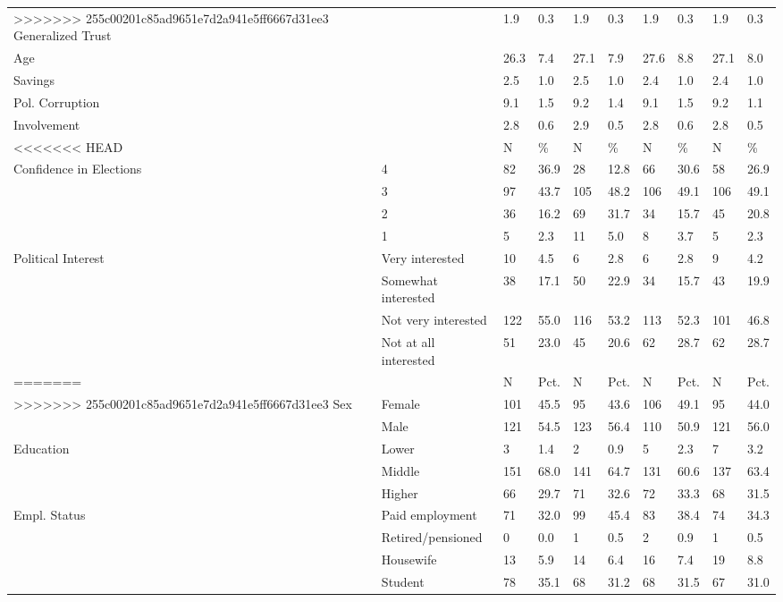 \begin{table}
\begin{tabular}[t]{llllllllll}
>>>>>>> 255c00201c85ad9651e7d2a941e5ff6667d31ee3
Generalized Trust &  & 1.9 & 0.3 & 1.9 & 0.3 & 1.9 & 0.3 & 1.9 & 0.3\\
Age &  & 26.3 & 7.4 & 27.1 & 7.9 & 27.6 & 8.8 & 27.1 & 8.0\\
Savings &  & 2.5 & 1.0 & 2.5 & 1.0 & 2.4 & 1.0 & 2.4 & 1.0\\
Pol. Corruption &  & 9.1 & 1.5 & 9.2 & 1.4 & 9.1 & 1.5 & 9.2 & 1.1\\
Involvement &  & 2.8 & 0.6 & 2.9 & 0.5 & 2.8 & 0.6 & 2.8 & 0.5\\
\midrule
<<<<<<< HEAD
 &  & N & \% & N & \% & N & \% & N & \%\\
Confidence in Elections & 4 & 82 & 36.9 & 28 & 12.8 & 66 & 30.6 & 58 & 26.9\\
 & 3 & 97 & 43.7 & 105 & 48.2 & 106 & 49.1 & 106 & 49.1\\
 & 2 & 36 & 16.2 & 69 & 31.7 & 34 & 15.7 & 45 & 20.8\\
 & 1 & 5 & 2.3 & 11 & 5.0 & 8 & 3.7 & 5 & 2.3\\
Political Interest & Very interested & 10 & 4.5 & 6 & 2.8 & 6 & 2.8 & 9 & 4.2\\
 & Somewhat interested & 38 & 17.1 & 50 & 22.9 & 34 & 15.7 & 43 & 19.9\\
 & Not very interested & 122 & 55.0 & 116 & 53.2 & 113 & 52.3 & 101 & 46.8\\
 & Not at all interested & 51 & 23.0 & 45 & 20.6 & 62 & 28.7 & 62 & 28.7\\
=======
 &  & N & Pct. & N & Pct. & N & Pct. & N & Pct.\\
>>>>>>> 255c00201c85ad9651e7d2a941e5ff6667d31ee3
Sex & Female & 101 & 45.5 & 95 & 43.6 & 106 & 49.1 & 95 & 44.0\\
 & Male & 121 & 54.5 & 123 & 56.4 & 110 & 50.9 & 121 & 56.0\\
Education & Lower & 3 & 1.4 & 2 & 0.9 & 5 & 2.3 & 7 & 3.2\\
 & Middle & 151 & 68.0 & 141 & 64.7 & 131 & 60.6 & 137 & 63.4\\
 & Higher & 66 & 29.7 & 71 & 32.6 & 72 & 33.3 & 68 & 31.5\\
Empl. Status & Paid employment & 71 & 32.0 & 99 & 45.4 & 83 & 38.4 & 74 & 34.3\\
 & Retired/pensioned & 0 & 0.0 & 1 & 0.5 & 2 & 0.9 & 1 & 0.5\\
 & Housewife & 13 & 5.9 & 14 & 6.4 & 16 & 7.4 & 19 & 8.8\\
 & Student & 78 & 35.1 & 68 & 31.2 & 68 & 31.5 & 67 & 31.0\\

\end{tabular}
\end{table}
